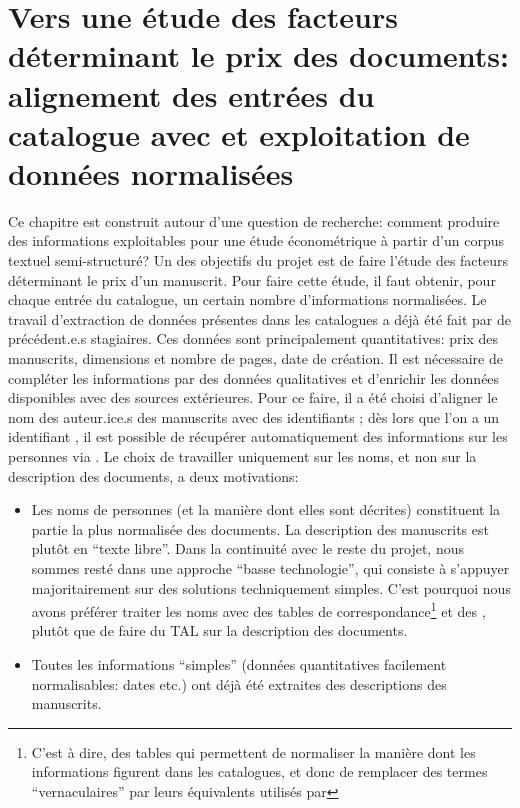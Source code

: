 \chapter{Vers une étude des facteurs déterminant le prix des documents: alignement des entrées du catalogue avec \wkd{} et exploitation de données normalisées}
Ce chapitre est construit autour d'une question de recherche: comment produire des informations exploitables pour une étude économétrique à partir d'un corpus textuel semi-structuré? Un des objectifs du projet est de faire l'étude des facteurs déterminant le prix d'un manuscrit. Pour faire cette étude, il faut obtenir, pour chaque entrée du catalogue, un certain nombre d'informations normalisées. Le travail d'extraction de données présentes dans les catalogues a déjà été fait par de précédent.e.s stagiaires. Ces données sont principalement quantitatives: prix des manuscrits, dimensions et nombre de pages, date de création. Il est nécessaire de compléter les informations par des données qualitatives et d'enrichir les données disponibles avec des sources extérieures. Pour ce faire, il a été choisi d'aligner le nom des auteur.ice.s des manuscrits avec des identifiants \wkd{}; dès lors que l'on a un identifiant \wkd{}, il est possible de récupérer automatiquement des informations sur les personnes via \sparql. Le choix de travailler uniquement sur les noms, et non sur la description des documents, a deux motivations:
\begin{itemize}
	\item Les noms de personnes (et la manière dont elles sont décrites) constituent la partie la plus normalisée des documents. La description des manuscrits est plutôt en \enquote{texte libre}. Dans la continuité avec le reste du projet, nous sommes resté dans une approche \enquote{basse technologie}, qui consiste à s'appuyer majoritairement sur des solutions techniquement simples. C'est pourquoi nous avons préférer traiter les noms avec des tables de correspondance\footnote{C'est à dire, des tables qui permettent de normaliser la manière dont les informations figurent dans les catalogues, et donc de remplacer des termes \enquote{vernaculaires} par leurs équivalents utilisés par \wkd{}} et des \rgxpl{}, plutôt que de faire du TAL sur la description des documents.
	\item Toutes les informations \enquote{simples} (données quantitatives facilement normalisables: dates etc.) ont déjà été extraites des descriptions des manuscrits.
\end{itemize}

